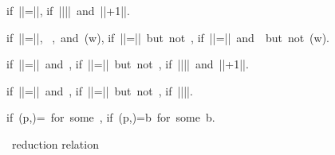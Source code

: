 \begin{figure*}
\redtwot{\sval{\impcrk{\vv}::\ks}{\sigma}{\vvp}}
        {\sval{\ks}{\sigma}{\vvp}}{\mbox{if }|\vv|=|\vvp|\mbox{,}}
        {\serr{\ks}{\sigma}{\impblame{\ell}}}{\mbox{if }|\vv|\ne|\vvp|\mbox{ and }|\vv|+1\ne|\vvp|\mbox{.}}
        {}
        
     {}
     {}

        {}{\mbox{if }|\vv|=|\vvp|\mbox{, } \chapof{\vvp}{\vv}\mbox{, and }(w)\mbox{,}}
        {\serr{\ks}{\sigma}{\chablame{\ell}}}{\mbox{if }|\vv|=|\vvp|\mbox{ but not }\chapof{\vvp}{\vv}\mbox{,}}
        {\serr{\ks}{\sigma}{\impblame{\ell}}}{\mbox{if }|\vv|=|\vvp|\mbox{ and }\chapof{\vvp}{\vv}\mbox{ but not }(w)\mbox{.}}

        {}{\mbox{if }|\vv|=|\vvp|\mbox{ and }\chapof{\vvp}{\vv}\mbox{,}}
        {\serr{\ks}{\sigma}{\chablame{\ell}}}{\mbox{if }|\vv|=|\vvp|\mbox{ but not }\chapof{\vvp}{\vv}\mbox{,}}
        {\serr{\ks}{\sigma}{\impblame{\ell}}}{\mbox{if }|\vv|\ne|\vvp|\mbox{ and }|\vv|+1\ne|\vvp|\mbox{.}}

     {}
     {}

     {}
     {}

     {}
     {}

\redthrt{\sval{\chacrk{\vv}::\ks}{\sigma}{\vvp}}
        {\sval{\ks}{\sigma}{\vvp}}{\mbox{if }|\vv|=|\vvp|\mbox{ and }\chapof{\vvp}{\vv}\mbox{,}}
        {\serr{\ks}{\sigma}{\chablame{\ell}}}{\mbox{if }|\vv|=|\vvp|\mbox{ but not }\chapof{\vvp}{\vv}\mbox{,}}
        {\serr{\ks}{\sigma}{\impblame{\ell}}}{\mbox{if }|\vv|\ne|\vvp|\mbox{.}}

        {\sval{\ks}{\sigma}{\vvp}}{\mbox{if }\delta(p,\vv)=\vvp\mbox{ for some }\vvp\mbox{,}}
        {}{\mbox{if }\delta(p,\vv)=b\mbox{ for some }b\mbox{.}}
        {}

\caption{\chapcalc\ reduction relation}
\label{fig:redrec}
\end{figure*}

